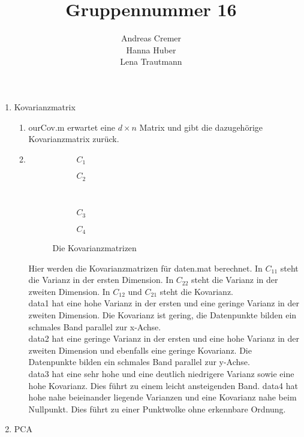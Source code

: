 \documentclass[]{report}
\title{Gruppennummer 16}
\author{Andreas Cremer\\Hanna Huber\\Lena Trautmann}
\newlength\figureheight
\newlength\figurewidth
\begin{document}
	\maketitle
	
	
	\begin{enumerate}
		\item Kovarianzmatrix
		\begin{enumerate}
			\item
			ourCov.m erwartet eine $d \times n$ Matrix und gibt die dazugehörige Kovarianzmatrix zurück.
			\item
			\setlength\figureheight{5cm}
			\setlength{}
			\begin{figure}
				\begin{subfigure}{0.45\textwidth}
					\centering
					
					\caption{$C_{1}$}
					\label{fig:cov1}
				\end{subfigure}
				\qquad
				\begin{subfigure}{0.45\textwidth}
					\centering
					
					\caption{$C_{2}$}
					\label{fig:cov2}
				\end{subfigure}	
				\\
				\begin{subfigure}{0.45\textwidth}
					\centering
					
					\caption{$C_{3}$}
					\label{fig:cov3}
				\end{subfigure}
				\qquad
				\begin{subfigure}{0.45\textwidth}
					\centering
					
					\caption{$C_{4}$}
					\label{fig:cov4}
				\end{subfigure}	
				\caption{Die Kovarianzmatrizen}
				\label{fig:cov}
			\end{figure}
			
			Hier werden die Kovarianzmatrizen für daten.mat berechnet. In $C_{11}$ steht die Varianz in der ersten Dimension. In $C_{22}$ steht die Varianz in der zweiten Dimension. In $C_{12}$ und $C_{21}$ steht die Kovarianz.\\
			data1 hat eine hohe Varianz in der ersten und eine geringe Varianz in der zweiten Dimension. Die Kovarianz ist gering, die Datenpunkte bilden ein schmales Band parallel zur x-Achse.\\
			data2 hat eine geringe Varianz in der ersten und eine hohe Varianz in der zweiten Dimension und ebenfalls eine geringe Kovarianz. Die Datenpunkte bilden ein schmales Band parallel zur y-Achse.\\
			data3 hat eine sehr hohe und eine deutlich niedrigere Varianz sowie eine hohe Kovarianz. Dies führt zu einem leicht ansteigenden Band.
			data4 hat hohe nahe beieinander liegende Varianzen und eine Kovarianz nahe beim Nullpunkt. Dies führt zu einer Punktwolke ohne erkennbare Ordnung.
		\end{enumerate}
		\item PCA\\
		

\end{enumerate}
\end{document}
